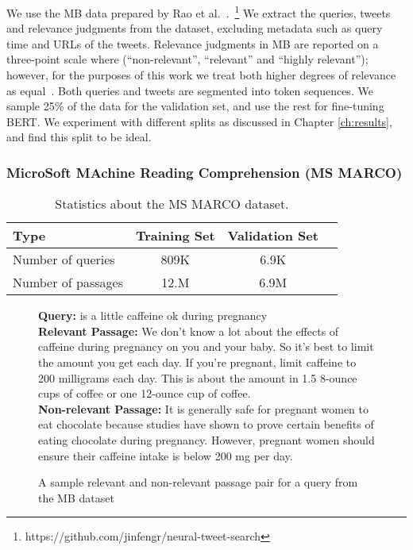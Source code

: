 We use the MB data prepared by Rao et al.~\cite{rao2019tweet}.~\footnote{https://github.com/jinfengr/neural-tweet-search}
We extract the queries, tweets and relevance judgments from the dataset, excluding metadata such as query time and URLs of the tweets.
Relevance judgments in MB are reported on a three-point scale where (``non-relevant'', ``relevant'' and ``highly relevant''); however, for the purposes of this work we treat both higher degrees of relevance as equal~\cite{ounisoverview}.
Both queries and tweets are segmented into token sequences.
We sample 25\% of the data for the validation set, and use the rest for fine-tuning BERT.
We experiment with different splits as discussed in Chapter \ref{ch:results}, and find this split to be ideal.

\subsubsection{MicroSoft MAchine Reading Comprehension (MS MARCO)}

\begin{table}[b]
\vspace{0.2cm}
\centering
\begin{tabular}{lccc}
\toprule
\textbf{Type} \mbox{\hspace{0.5cm}} & \textbf{Training Set} \mbox{\hspace{1.0cm}} & \textbf{Validation Set} \mbox{\hspace{1.0cm}} \\
\toprule
Number of queries & 809K & 6.9K \\
Number  of passages & 12.M & 6.9M \\
\bottomrule
\end{tabular}
\vspace{0.2cm}
\caption{Statistics about the MS MARCO dataset.}
\label{tab:marco-stats}
\end{table}

\begin{figure}[b!]
	\begin{framed}
    		\textbf{Query:} is a little caffeine ok during pregnancy \\
    		\textbf{Relevant Passage:} We don't know a lot about the effects of caffeine during pregnancy on you and your baby. So it's best to limit the amount you get each day. If you're pregnant, limit caffeine to 200 milligrams each day. This is about the amount in 1.5 8-ounce cups of coffee or one 12-ounce cup of coffee. \\
    		\textbf{Non-relevant Passage:} It is generally safe for pregnant women to eat chocolate because studies have shown to prove certain benefits of eating chocolate during pregnancy. However, pregnant women should ensure their caffeine intake is below 200 mg per day. \\
	\end{framed}
\label{marco-example}
 \caption{A sample relevant and non-relevant passage pair for a query from the MB dataset}
\end{figure}


